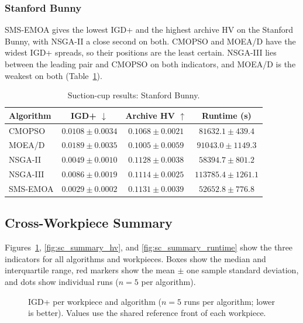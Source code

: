 \subsubsection{Stanford Bunny}
\label{subsubsec:results_sc_bunny}

SMS-EMOA gives the lowest IGD+ and the highest archive HV on the Stanford Bunny, with NSGA-II
a close second on both. CMOPSO and MOEA/D have the widest IGD+ spreads, so their positions
are the least certain. NSGA-III lies between the leading pair and CMOPSO on both indicators,
and MOEA/D is the weakest on both (Table~\ref{tab:sc_evo_bunny}).

\begin{table}[htbp]
    \centering
    \caption{Suction-cup results: Stanford Bunny.}
    \label{tab:sc_evo_bunny}
    \begin{tabular}{@{}lccc@{}}
        \toprule
        \textbf{Algorithm} & \textbf{IGD+} $\downarrow$ & \textbf{Archive HV} $\uparrow$ & \textbf{Runtime (s)} \\
        \midrule
        CMOPSO   & $0.0108 \pm 0.0034$ & $0.1068 \pm 0.0021$ & $81632.1 \pm 439.4$ \\
        MOEA/D   & $0.0189 \pm 0.0035$ & $0.1005 \pm 0.0059$ & $91043.0 \pm 1149.3$ \\
        NSGA-II  & $0.0049 \pm 0.0010$ & $0.1128 \pm 0.0038$ & $58394.7 \pm 801.2$ \\
        NSGA-III & $0.0086 \pm 0.0019$ & $0.1114 \pm 0.0025$ & $113785.4 \pm 1261.1$ \\
        SMS-EMOA & {\boldmath$0.0029 \pm 0.0002$} & {\boldmath$0.1131 \pm 0.0039$} & $52652.8 \pm 776.8$ \\
        \bottomrule
    \end{tabular}
\end{table}

\subsection{Cross-Workpiece Summary}
\label{subsec:results_sc_summary}

Figures~\ref{fig:sc_summary_igdplus}, \ref{fig:sc_summary_hv}, and \ref{fig:sc_summary_runtime}
show the three indicators for all algorithms and workpieces. Boxes show the median and
interquartile range, red markers show the mean $\pm$ one sample standard deviation, and dots
show individual runs ($n=5$ per algorithm).

\begin{figure}[H]
    \centering
    \caption{IGD+ per workpiece and algorithm ($n=5$ runs per algorithm; lower is better).
    Values use the shared reference front of each workpiece.}
    \label{fig:sc_summary_igdplus}
\end{figure}

